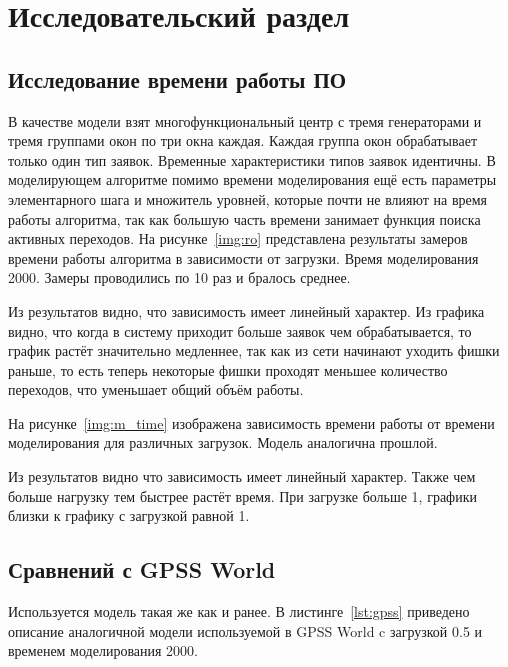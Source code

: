 \chapter{Исследовательский раздел}
	
\section{Исследование времени работы ПО}

В качестве модели взят многофункциональный центр с тремя генераторами и тремя группами окон по три окна каждая. Каждая группа окон обрабатывает только один тип заявок. Временные характеристики типов заявок идентичны. В моделирующем алгоритме помимо времени моделирования ещё есть параметры элементарного шага и множитель уровней, которые почти не влияют на время работы алгоритма, так как большую часть времени занимает функция поиска активных переходов.
На рисунке~\ref{img:ro} представлена результаты замеров времени работы алгоритма в зависимости от загрузки. Время моделирования 2000. Замеры проводились по 10 раз и бралось среднее.

\FloatBarrier

Из результатов видно, что зависимость имеет линейный характер. Из графика видно, что когда в систему приходит больше заявок чем обрабатывается, то график растёт значительно медленнее, так как из сети начинают уходить фишки раньше, то есть теперь некоторые фишки проходят меньшее количество переходов, что уменьшает общий объём работы.

На рисунке~\ref{img:m_time} изображена зависимость времени работы от времени моделирования для различных загрузок. Модель аналогична прошлой.  

\FloatBarrier

Из результатов видно что зависимость имеет линейный характер. Также чем больше нагрузку тем быстрее растёт время. При загрузке больше 1, графики близки к графику с загрузкой равной 1.

\section{Сравнений с GPSS World}

Используется модель такая же как и ранее. В листинге~\ref{lst:gpss} приведено описание аналогичной модели используемой в GPSS World c загрузкой 0.5 и временем моделирования 2000.

